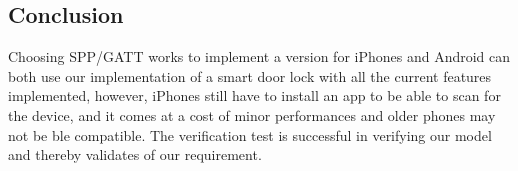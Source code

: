 \newpage\subsection{Conclusion}
Choosing SPP/GATT works to implement a version for iPhones and Android can both use our implementation of a smart door lock with all the current features implemented, however, iPhones still have to install an app to be able to scan for the device, and it comes at a cost of minor performances and older phones may not be \gls{ble} compatible. The verification test is successful in verifying our model and thereby validates of our requirement.
